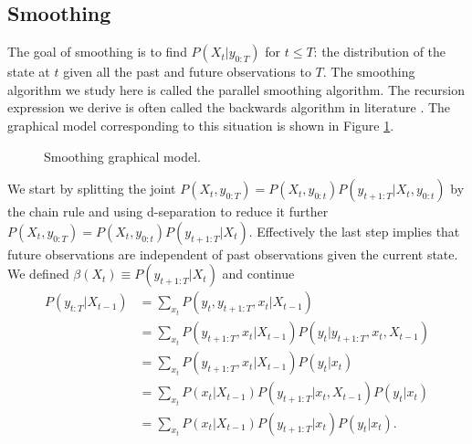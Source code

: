 \subsection{Smoothing}
The goal of smoothing is to find $P(X_t|y_{0:T})$ for $t\leq T$: the distribution of the state at $t$ given all the past and future observations to $T$. The smoothing algorithm we study here is called the parallel smoothing algorithm. The recursion expression we derive is often called the backwards algorithm in literature \cite{murphy1}. The graphical model corresponding to this situation is shown in Figure \ref{fig_linmod_smooth_hmm}.
\begin{figure}[H] 
\centering
{}
\caption{Smoothing graphical model.}
\label{fig_linmod_smooth_hmm}
\end{figure}
We start by splitting the joint $P(X_t, y_{0:T}) = P(X_t, y_{0:t})P(y_{t+1:T}|X_t,y_{0:t})$ by the chain rule and using d-separation to reduce it further $P(X_t, y_{0:T}) = P(X_t, y_{0:t})P(y_{t+1:T}|X_t)$. Effectively the last step implies that future observations are independent of past observations given the current state. We defined $\beta(X_t)\equiv P(y_{t+1:T}|X_t)$ and continue
\begin{equation}
\begin{aligned}
P(y_{t:T}|X_{t-1}) &= \sum_{x_t} P(y_t, y_{t+1:T}, x_t|X_{t-1}) \\
&= \sum_{x_t} P(y_{t+1:T}, x_t | X_{t-1})P(y_t| y_{t+1:T}, x_t, X_{t-1}) \\
&= \sum_{x_t} P(y_{t+1:T}, x_t | X_{t-1})P(y_t| x_t) \\
&= \sum_{x_t} P(x_t | X_{t-1})P(y_{t+1:T}| x_t,X_{t-1})P(y_t| x_t) \\
&= \sum_{x_t} P(x_t | X_{t-1})P(y_{t+1:T}| x_t)P(y_t| x_t).
\end{aligned}
\label{eq_backwards_no_recur}
\end{equation}
